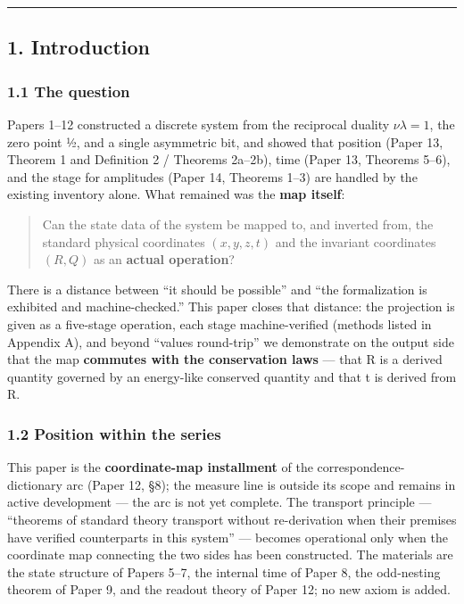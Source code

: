 \documentclass[
]{ltjsarticle}
\begin{document}
\begin{center}\rule{0.5\linewidth}{0.5pt}\end{center}

\subsection{1. Introduction}\label{introduction}

\subsubsection{1.1 The question}\label{the-question}

Papers 1--12 constructed a discrete system from the reciprocal duality
\(\nu\lambda=1\), the zero point ½, and a single asymmetric bit, and
showed that position (Paper 13, Theorem 1 and Definition 2 / Theorems
2a--2b), time (Paper 13, Theorems 5--6), and the stage for amplitudes
(Paper 14, Theorems 1--3) are handled by the existing inventory alone.
What remained was the \textbf{map itself}:

\begin{quote}
Can the state data of the system be mapped to, and inverted from, the
standard physical coordinates \((x,y,z,t)\) and the invariant
coordinates \((R,Q)\) as an \textbf{actual operation}?
\end{quote}

There is a distance between ``it should be possible'' and ``the
formalization is exhibited and machine-checked.'' This paper closes that
distance: the projection is given as a five-stage operation, each stage
machine-verified (methods listed in Appendix A), and beyond ``values
round-trip'' we demonstrate on the output side that the map
\textbf{commutes with the conservation laws} --- that R is a derived
quantity governed by an energy-like conserved quantity and that t is
derived from R.

\subsubsection{1.2 Position within the
series}\label{position-within-the-series}

This paper is the \textbf{coordinate-map installment} of the
correspondence-dictionary arc (Paper 12, §8); the measure line is
outside its scope and remains in active development --- the arc is not
yet complete. The transport principle --- ``theorems of standard theory
transport without re-derivation when their premises have verified
counterparts in this system'' --- becomes operational only when the
coordinate map connecting the two sides has been constructed. The
materials are the state structure of Papers 5--7, the internal time of
Paper 8, the odd-nesting theorem of Paper 9, and the readout theory of
Paper 12; no new axiom is added.
\end{document}
